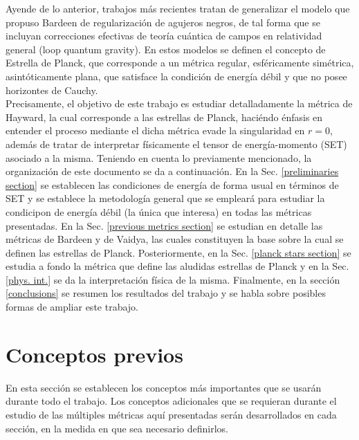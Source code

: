 \documentclass[16pt,a4paper]{article}
\numberwithin{equation}{section}
\theoremstyle{definition}
\begin{document}
Ayende de lo anterior, trabajos más recientes \cite{hayward2006,lorenzo,rovelli} tratan de generalizar el modelo que propuso Bardeen de regularización de agujeros negros, de tal forma que se incluyan correcciones efectivas de teoría cuántica de campos en relatividad general (loop quantum gravity). En estos modelos se definen el concepto de Estrella de Planck, que corresponde a un métrica regular, esféricamente simétrica, asintóticamente plana, que satisface la condición de energía débil y que no posee horizontes de Cauchy.\\

Precisamente, el objetivo de este trabajo es estudiar detalladamente la métrica de Hayward, la cual corresponde a las estrellas de Planck, haciéndo énfasis en entender el proceso mediante el dicha métrica evade la singularidad en $r = 0$, además de tratar de interpretar físicamente el tensor de energía-momento (SET) asociado a la misma. Teniendo en cuenta lo previamente mencionado, la organización de este documento se da a continuación. En la Sec. \ref{preliminaries section} se establecen las condiciones de energía de forma usual en términos de SET y se establece la metodología general que se empleará para estudiar la condicipon de energía débil (la única que interesa) en todas las métricas presentadas. En la Sec. \ref{previous metrics section} se estudian en detalle las métricas de Bardeen y de Vaidya, las cuales constituyen la base sobre la cual se definen las estrellas de Planck. Posteriormente, en la Sec. \ref{planck stars section} se estudia a fondo la métrica que define las aludidas estrellas de Planck y en la Sec. \ref{phys. int.} se da la interpretación física de la misma. Finalmente, en la sección \ref{conclusions} se resumen los resultados del trabajo y se habla sobre posibles formas de ampliar este trabajo.\\


\newpage
\section{\label{preliminaries section}Conceptos previos}

En esta sección se establecen los conceptos más importantes que se usarán durante todo el trabajo. Los conceptos adicionales que se requieran durante el estudio de las múltiples métricas aquí presentadas serán desarrollados en cada sección, en la medida en que sea necesario definirlos.
\end{document}
